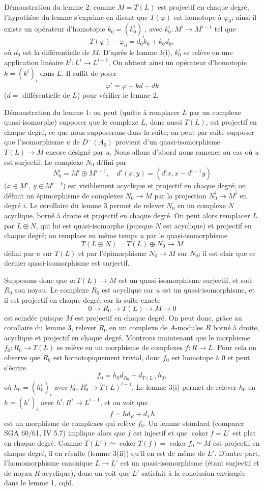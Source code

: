 \documentclass[11pt]{article}
\providecommand{\coker}{\operatorname{coker}}
\providecommand{\coker}{\operatorname{Coker}}
\begin{document}
Démonstration du lemme 2: comme $M=T(L)$ est projectif en chaque degré, l'hypothèse du lemme s'exprime en disant que $T(\varphi)$ est homotope à $\varphi_0$; ainsi il existe un opérateur d'homotopie $k_0=(k_0^i)_i$, avec $k_0^i:M^i\to M^{i-1}$ tel que
\[
T(\varphi)-\varphi_0=d_0k_0+k_0d_0,
\]
où $d_0$ est la différentielle de $M$. D'après le lemme 3(i), $k_0^i$ se relève en une application linéaire $k^i:L^i\to L^{i-1}$. On obtient ainsi un opérateur d'homotopie $k=(k^i)_i$ dans $L$. Il suffit de poser
\[
\varphi'=\varphi-kd-dk
\]
($d=$ différentielle de $L$) pour vérifier le lemme 2.

Démonstration du lemme 1: on peut (quitte à remplacer $L$ par un complexe quasi-isomorphe) supposer que le complexe $L$, donc aussi $T(L)$, est projectif en chaque degré, ce que nous supposerons dans la suite; on peut par suite supposer que l'isomorphisme $u$ de $D^-(A_0)$ provient d'un quasi-isomorphisme $T(L)\to M$ encore désigné par $u$. Nous allons d'abord nous ramener au cas où $u$ est surjectif. Le complexe $N_0$ défini par
\[
N_0^i=M^i\oplus M^{i-1},
\quad
 d^i(x,y)=(d^i x,x-d^{i-1}y)
\]
($x\in M^i$, $y\in M^{i-1}$) est visiblement acyclique et projectif en chaque degré; on définit un épimorphisme de complexes $N_0\to M$ par la projection $N_0^i\to M^i$ en degré $i$. Le corollaire du lemme 3 permet de relever $N_0$ en un complexe $N$ acyclique, borné à droite et projectif en chaque degré. On peut alors remplacer $L$ par $L\oplus N$, qui lui est quasi-isomorphe (puisque $N$ est acyclique) et projectif en chaque degré; on remplace en même temps $u$ par le quasi-isomorphisme
\[
T(L\oplus N)=T(L)\oplus N_0\longrightarrow M
\]
défini par $u$ sur $T(L)$ et par l'épimorphisme $N_0\to M$ sur $N_0$; il est clair que ce dernier quasi-isomorphisme est surjectif.

Supposons donc que $u:T(L)\to M$ est un quasi-isomorphisme surjectif, et soit $R_0$ son noyau. Le complexe $R_0$ est acyclique car $u$ est un quasi-isomorphisme, et il est projectif en chaque degré, car la suite exacte
\[
0\longrightarrow R_0\longrightarrow T(L)\longrightarrow M\longrightarrow0
\]
est scindée puisque $M$ est projectif en chaque degré. On peut donc, grâce au corollaire du lemme 3, relever $R_0$ en un complexe de $A$-modules $R$ borné à droite, acyclique et projectif en chaque degré. Montrons maintenant que le morphisme $f_0:R_0\to T(L)$ se relève en un morphisme de complexes $f:R\to L$. Pour cela on observe que $R_0$ est homotopiquement trivial, donc $f_0$ est homotope à $0$ et peut s'écrire
\[
f_0=h_0d_{R_0}+d_{T(L)}h_0,
\]
où $h_0=(h_0^i)_i$ avec $h_0^i:R_0^i\to T(L)^{i-1}$. Le lemme 3(i) permet de relever $h_0$ en $h=(h^i)_i$ avec $h^i:R^i\to L^{i-1}$, et on voit que
\[
f=hd_R+d_Lh
\]
est un morphisme de complexes qui relève $f_0$. Un lemme standard (comparer SGA 60/61, IV 5.7) implique alors que $f$ est injectif et que $\coker f=L'$ est plat en chaque degré. Comme $T(L')\simeq\coker T(f)=\coker f_0\simeq M$ est projectif en chaque degré, il en résulte (lemme 3(ii)) qu'il en est de même de $L'$. D'autre part, l'homomorphisme canonique $L\to L'$ est un quasi-isomorphisme (étant surjectif et de noyau $R$ acyclique), donc on voit que $L'$ satisfait à la conclusion envisagée dans le lemme 1, cqfd.
\end{document}
